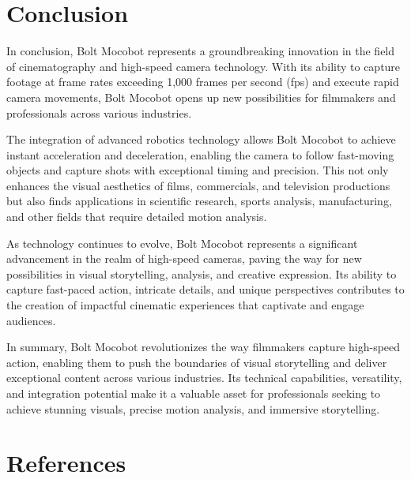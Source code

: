 \documentclass[a4paper,11pt]{report}
\begin{document}
\chapter{Conclusion}
In conclusion, Bolt Mocobot represents a groundbreaking innovation in the field of cinematography and high-speed camera technology. With its ability to capture footage at frame rates exceeding 1,000 frames per second (fps) and execute rapid camera movements, Bolt Mocobot opens up new possibilities for filmmakers and professionals across various industries.

The integration of advanced robotics technology allows Bolt Mocobot to achieve instant acceleration and deceleration, enabling the camera to follow fast-moving objects and capture shots with exceptional timing and precision. This not only enhances the visual aesthetics of films, commercials, and television productions but also finds applications in scientific research, sports analysis, manufacturing, and other fields that require detailed motion analysis.

As technology continues to evolve, Bolt Mocobot represents a significant advancement in the realm of high-speed cameras, paving the way for new possibilities in visual storytelling, analysis, and creative expression. Its ability to capture fast-paced action, intricate details, and unique perspectives contributes to the creation of impactful cinematic experiences that captivate and engage audiences.

In summary, Bolt Mocobot revolutionizes the way filmmakers capture high-speed action, enabling them to push the boundaries of visual storytelling and deliver exceptional content across various industries. Its technical capabilities, versatility, and integration potential make it a valuable asset for professionals seeking to achieve stunning visuals, precise motion analysis, and immersive storytelling.

\chapter{References}
\end{document}
